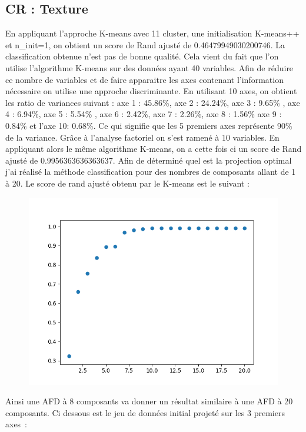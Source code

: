 \documentclass[12pt]{scrartcl} %
\begin{document}
\subsection{CR : Texture}
En appliquant l'approche K-means avec 11 cluster, une initialisation K-means++ et n\_init=1, on obtient un score de Rand ajusté de 0.46479949030200746. La classification obtenue n'est pas de bonne qualité. Cela vient du fait que l'on utilise l'algorithme K-means sur des données ayant 40 variables. Afin de réduire ce nombre de variables et de faire apparaitre les axes contenant l'information nécessaire on utilise une approche discriminante. En utilisant 10 axes, on obtient les ratio de variances suivant : axe 1 : 45.86\%, axe 2 : 24.24\%, axe 3 : 9.65\% , axe 4 : 6.94\%, axe 5 :  5.54\% , axe 6 : 2.42\%, axe 7 :
 2.26\%, axe 8 : 1.56\% axe 9 : 0.84\% et l'axe 10: 0.68\%. Ce qui signifie que les 5 premiers axes représente 90\% de la variance. Grâce à l'analyse factoriel on s'est ramené à 10 variables. En appliquant alors le même algorithme K-means, on a cette fois ci un score de Rand ajusté de 0.9956363636363637. Afin de déterminé quel est la projection optimal j'ai réalisé la méthode classification pour des nombres de composants allant de 1 à 20. Le score de rand ajusté obtenu par le K-means est le suivant : 
\newline
\begin{figure}[!h]
 \centering 
\includegraphics[scale=.3]{AFD_K_means.png}
\end{figure}
\newline 
Ainsi une AFD à 8 composants va donner un résultat similaire à une AFD à 20 composants. Ci dessous est le jeu de données initial projeté sur les 3 premiers axes~: 
\end{document}
